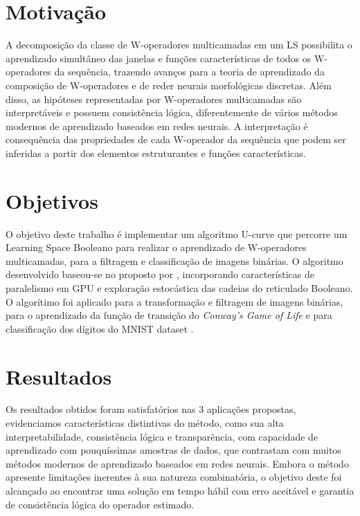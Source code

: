 \section{Motivação}
\label{sec:motiv}

A decomposição da classe de W-operadores multicamadas em um LS possibilita o aprendizado simultâneo das janelas e funções características de todos os W-operadores da sequência, trazendo avanços para a teoria de aprendizado da composição de W-operadores e de reder neurais morfológicas discretas. Além disso, as hipóteses representadas por W-operadores multicamadas são interpretáveis e possuem consistência lógica, diferentemente de vários métodos modernos de aprendizado baseados em redes neurais. A interpretação é consequência das propriedades de cada W-operador da sequência que podem ser inferidas a partir dos elementos estruturantes e funções características.

\section{Objetivos}
\label{sec:obj}

 O objetivo deste trabalho é implementar um algoritmo U-curve que percorre um Learning Space Booleano para realizar o aprendizado de W-operadores multicamadas, para a filtragem e classificação de imagens binárias. O algoritmo desenvolvido baseou-se no proposto por \cite{DIEGO:01}, incorporando características de paralelismo em GPU e exploração estocástica das cadeias do reticulado Booleano. O algorítimo foi aplicado para a transformação e filtragem de imagens binárias, para o aprendizado da função de transição do \textit{Conway's Game of Life} \cite{GOL} e para classificação dos dígitos do MNIST dataset \cite{MNIST:dataset}.

\section{Resultados}

Os resultados obtidos foram satisfatórios nas 3 aplicações propostas, evidenciamos características distintivas do método, como sua alta interpretabilidade, consistência lógica e transparência, com capacidade de aprendizado com pouquíssimas amostras de dados, que contrastam com muitos métodos modernos de aprendizado baseados em redes neurais. Embora o método apresente limitações inerentes à sua natureza combinatória, o objetivo deste foi alcançado ao encontrar uma solução em tempo hábil com erro aceitável e garantia de consistência lógica do operador estimado.

